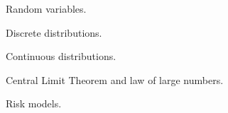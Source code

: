 \documentclass{osucourse}
\begin{document}
\CatalogDescription
\PrerequisitesAndExclusions

\begin{TopicsList}
\item Random variables.
\item Discrete distributions.
\item Continuous distributions.
\item Central Limit Theorem and law of large numbers.
\item Risk models.
\end{TopicsList}
\end{document}
